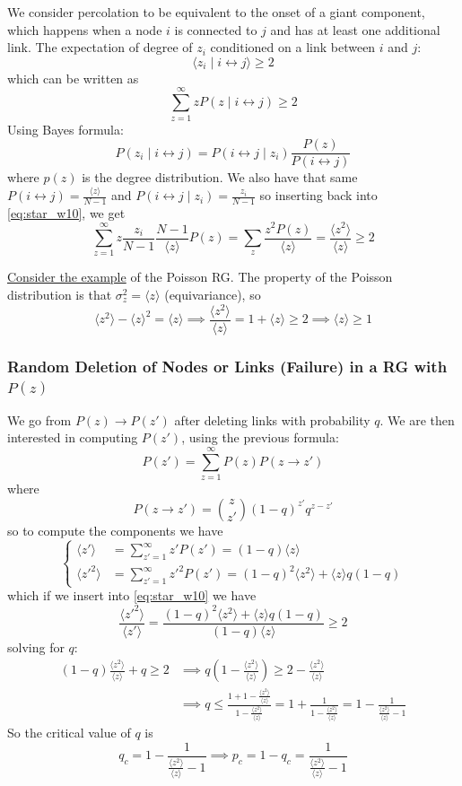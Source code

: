 \documentclass[12pt]{article}
\theoremstyle{definition}
\begin{document}
We consider percolation to be equivalent to the onset of a giant component, which happens when a node $i$ is connected to $j$ and has at least one additional link. The expectation of degree of $z_i$ conditioned on a link between $i$ and $j$: 
\[
\langle z_i\mid i\leftrightarrow j\rangle\geq 2
\]
which can be written as
\begin{equation*} \label{eq:star_w10}
\sum_{z=1}^\infty z P(z\mid i\leftrightarrow j)\geq 2 \tag{*}
\end{equation*}
Using Bayes formula: 
\[
P(z_i\mid i\leftrightarrow j)=P(i\leftrightarrow j\mid z_i)\frac{P(z)}{P(i\leftrightarrow j)}
\]
where $p(z)$ is the degree distribution. We also have that same $P(i\leftrightarrow j)=\frac{\langle z\rangle}{N-1}$ and $P(i\leftrightarrow j\mid z_i)=\frac{z_i}{N-1}$ so inserting back into \ref{eq:star_w10}, we get
\[
\sum_{z=1}^\infty z\frac{z_i}{N-1}\frac{N-1}{\langle z\rangle}P(z)=\sum_{z}\frac{z^2P(z)}{\langle z\rangle}=\frac{\langle z^2\rangle}{\langle z\rangle}\geq 2
\]

\underline{Consider the example} of the Poisson RG. The property of the Poisson distribution is that $\sigma_z^2=\langle z\rangle$ (equivariance), so
\[
\langle z^2\rangle - \langle z\rangle^2=\langle z\rangle \implies \frac{\langle z^2\rangle}{\langle z\rangle}=1 + \langle z\rangle\geq 2\implies \langle z\rangle\geq 1
\]

\subsubsection*{Random Deletion of Nodes or Links (Failure) in a RG with $P(z)$}

We go from $P(z)\to P(z')$ after deleting links with probability $q$. We are then interested in computing $P(z')$, using the previous formula: 
\[
P(z')=\sum_{z=1}^\infty P(z)P(z\to z')
\]
where
\[
P(z\to z')=\binom{z}{z'}(1-q)^{z'}q^{z-z'}
\]
so to compute the components we have 
\[
\begin{cases}
    \langle z'\rangle &= \sum_{z'=1}^\infty z' P(z')= (1-q)\langle z\rangle \\ 
    \langle z'^2\rangle &= \sum_{z'=1}^\infty z'^2P(z')= (1-q)^2\langle z^2\rangle+\langle z\rangle q(1-q)
\end{cases}
\]
which if we insert into \ref{eq:star_w10} we have
\[
\frac{\langle z'^2\rangle}{\langle z'\rangle} = \frac{(1-q)^2\langle z^2\rangle+\langle z\rangle q(1-q)}{(1-q)\langle z\rangle}\geq 2
\]
solving for $q$: 
\begin{align*}
(1-q)\frac{\langle z^2\rangle}{\langle z\rangle}+q\geq 2 &\implies q\left(1-\frac{\langle z^2\rangle}{\langle z\rangle}\right)\geq 2-\frac{\langle z^2\rangle}{\langle z\rangle} \\
&\implies q\leq\frac{1+1-\frac{\langle z^2\rangle}{\langle z\rangle}}{1-\frac{\langle z^2\rangle}{\langle z\rangle}}=1+\frac{1}{1-\frac{\langle z^2\rangle}{\langle z\rangle}}=1-\frac{1}{\frac{\langle z^2\rangle}{\langle z\rangle}-1}
\end{align*}
So the critical value of $q$ is
\[
q_c=1-\frac{1}{\frac{\langle z^2\rangle}{\langle z\rangle}-1}\implies p_c=1-q_c=\frac{1}{\frac{\langle z^2\rangle}{\langle z\rangle}-1}
\]
\end{document}
